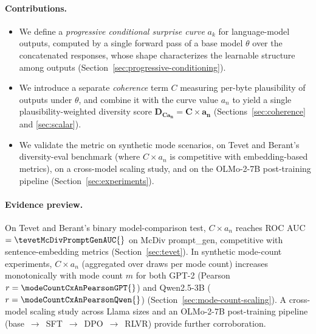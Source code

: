 \paragraph{Contributions.}
\begin{itemize}[leftmargin=*, itemsep=2pt]
  \item We define a \emph{progressive conditional surprise curve} $a_k$ for language-model outputs, computed by a single forward pass of a base model $\theta$ over the concatenated responses, whose shape characterizes the learnable structure among outputs (Section~\ref{sec:progressive-conditioning}).
  \item We introduce a separate \emph{coherence} term $C$ measuring per-byte plausibility of outputs under $\theta$, and combine it with the curve value $a_n$ to yield a single plausibility-weighted diversity score $\mathbf{D_{Ca_n} = C \times a_n}$ (Sections~\ref{sec:coherence} and \ref{sec:scalar}).
  \item We validate the metric on synthetic mode scenarios, on Tevet and Berant's diversity-eval benchmark (where $C \times a_n$ is competitive with embedding-based metrics), on a cross-model scaling study, and on the OLMo-2-7B post-training pipeline (Section~\ref{sec:experiments}).
\end{itemize}

\paragraph{Evidence preview.}
On Tevet and Berant's binary model-comparison test, $C \times a_n$ reaches ROC AUC $= \tevetMcDivPromptGenAUC{}$ on McDiv prompt\_gen, competitive with sentence-embedding metrics (Section~\ref{sec:tevet}).
In synthetic mode-count experiments, $C \times a_n$ (aggregated over \modeCountNDraws{} draws per mode count) increases monotonically with mode count $m$ for both GPT-2 (Pearson $r = \modeCountCxAnPearsonGPT{}$) and Qwen2.5-3B ($r = \modeCountCxAnPearsonQwen{}$) (Section~\ref{sec:mode-count-scaling}).
A cross-model scaling study across \scalingNumLlamaModels{} Llama sizes and an OLMo-2-7B post-training pipeline (base~$\to$~SFT~$\to$~DPO~$\to$~RLVR) provide further corroboration.

